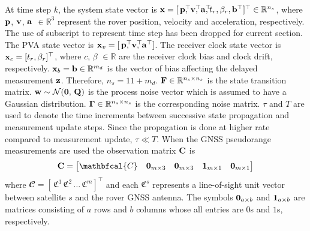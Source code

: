 At time step $k$, the system state vector is $\Boldx = [\,\Boldp^\top \dss,  \, \Boldv^\top \dss, \, \Bolda^\top \dss, t_r, \beta_r, \Boldb^\top ]^\top \in \mathbb{R}^{n_s} $, where $\mathbf{p}$, $\mathbf{v}$, $\mathbf{a}$ $\in \mathbb{R}^3$ represent the rover position, velocity and acceleration, respectively.
The use of subscript to represent time step has been dropped for current section. 
The PVA state vector is $\Boldx_v = [\,\Boldp^\top \dss,  \, \Boldv^\top \dss, \, \Bolda^\top]$.
The receiver clock state vector is $\mathbf{x}_c = [t_r, \beta_r]^\top$, where $c$, $\beta$ $\in \mathbb{R}$ are the receiver clock bias and clock drift, respectively. 
$\mathbf{x}_b = \mathbf{b}\in \mathbb{R}^{m_d}$ is the vector of bias affecting the delayed measurement $\mathbf{z}$. 
Therefore, $n_s = 11 + m_d$. $\mathbf{F} \in \mathbb{R}^{n_s \times n_s}$ is the state transition matrix.
$\mathbf{w} \sim \mathcal{N}(\boldsymbol{0},\,\mathbf{Q})$ is the process noise vector which is assumed to have a Gaussian distribution. $\boldsymbol{\Gamma} \in \mathbb{R}^{n_s \times n_s}$ is the corresponding noise matrix. $\tau$ and $T$ are used to denote the time increments between successive state propagation and measurement update steps. 
Since the propagation is done at higher rate compared to measurement update, $\tau \ll T$.
When the GNSS pseudorange measurements are used the observation matrix $\mathbf{C}$ is
\begin{equation}
	\BoldC = \begin{bmatrix}		
		\mathbfcal{C} & \0_{m \times 3} & \0_{m \times 3} & \1_{m \times 1} & \0_{m \times 1} \\		
	\end{bmatrix}
\end{equation}
where $\mathbfcal{C} = [\, \mathfrak{C}^1 \, \mathfrak{C}^2 \, \dots \, \mathfrak{C}^m ]^\top$ and each $\mathfrak{C}^s$ represents a line-of-sight unit vector between satellite $s$ and the rover GNSS antenna. 
The symbols $\boldsymbol{0}_{a \times b}$ and $\boldsymbol{1}_{a \times b}$ are  matrices consisting of $a$ rows and $b$ columns whose all entries are $0$s and $1$s, respectively. 

